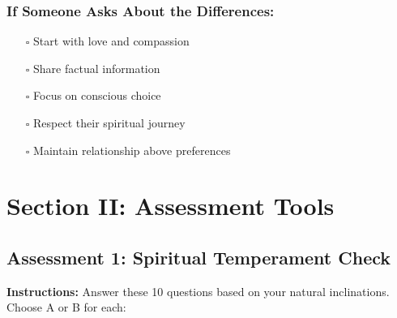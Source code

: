 \documentclass[11pt,twoside]{book}
\begin{document}
\subsubsection*{If Someone Asks About the Differences:}
\label{sec:orgasked}
\begin{itemize}
\item[$\square$] Start with love and compassion
\item[$\square$] Share factual information
\item[$\square$] Focus on conscious choice
\item[$\square$] Respect their spiritual journey
\item[$\square$] Maintain relationship above preferences
\end{itemize}

\section*{Section II: Assessment Tools}
\label{sec:orgassessment}

\subsection*{Assessment 1: Spiritual Temperament Check}
\label{sec:orgtemperament}

\textbf{Instructions:} Answer these 10 questions based on your natural inclinations. Choose A or B for each:
\end{document}
